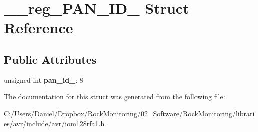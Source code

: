 \hypertarget{struct____reg___p_a_n___i_d__1}{}\section{\+\_\+\+\_\+reg\+\_\+\+P\+A\+N\+\_\+\+I\+D\+\_ Struct Reference}
\label{struct____reg___p_a_n___i_d__1}
\subsection*{Public Attributes}
\begin{DoxyCompactItemize}
\item 
unsigned int {\bfseries pan\+\_\+id\+\_}\+: 8\hypertarget{struct____reg___p_a_n___i_d__1_adb4a322f2143c6233077596875ae20ac}{}\label{struct____reg___p_a_n___i_d__1_adb4a322f2143c6233077596875ae20ac}

\end{DoxyCompactItemize}


The documentation for this struct was generated from the following file\+:\begin{DoxyCompactItemize}
\item 
C\+:/\+Users/\+Daniel/\+Dropbox/\+Rock\+Monitoring/02\+\_\+\+Software/\+Rock\+Monitoring/libraries/avr/include/avr/iom128rfa1.\+h\end{DoxyCompactItemize}
